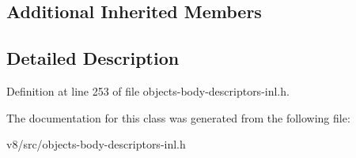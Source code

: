 \subsection*{Additional Inherited Members}


\subsection{Detailed Description}


Definition at line 253 of file objects-\/body-\/descriptors-\/inl.\+h.



The documentation for this class was generated from the following file\+:\begin{DoxyCompactItemize}
\item 
v8/src/objects-\/body-\/descriptors-\/inl.\+h\end{DoxyCompactItemize}
